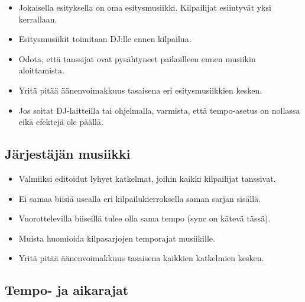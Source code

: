 \documentclass[12pt, a4paper, oneside]{article}
\begin{document}
\begin{itemize}
    \item Jokaisella esityksella on oma esitysmusiikki. Kilpailijat esiintyvät yksi kerrallaan.
    \item Esitysmusiikit toimitaan DJ:lle ennen kilpailua.
    \item Odota, että tanssijat ovat pysähtyneet paikoilleen ennen musiikin aloittamista.
    \item Yritä pitää äänenvoimakkuus tasaisena eri esitysmusiikkien kesken.
    \item Jos soitat DJ-laitteilla tai ohjelmalla, varmista, että tempo-asetus on nollassa eikä efektejä ole päällä.
\end{itemize}

\subsection{Järjestäjän musiikki}

\begin{itemize}
    \item Valmiiksi editoidut lyhyet katkelmat, joihin kaikki kilpailijat tanssivat.
    \item Ei samaa biisiä usealla eri kilpailukierroksella saman sarjan sisällä.
    \item Vuorottelevilla biiseillä tulee olla sama tempo (sync on kätevä tässä).
    \item Muista huomioida kilpasarjojen temporajat musiikille.
    \item Yritä pitää äänenvoimakkuus tasaisena kaikkien katkelmien kesken.
\end{itemize}

\subsection{Tempo- ja aikarajat} \label{rajat}
\end{document}
